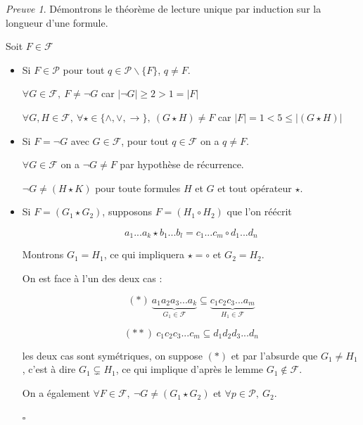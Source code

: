 \documentclass[]{article}
\theoremstyle{remark}
\newtheorem{myproof}{Preuve}
\theoremstyle{definition}
\newcommand{\cqfd}{
	\hfill$\square$
}
\begin{document}
\begin{myproof}
	Démontrons le théorème de lecture unique par induction sur la longueur d'une formule.
	
	Soit $F \in \mathcal{F}$
	
	\begin{itemize}
		\item Si $F \in \mathcal{P}$ pour tout $q \in \mathcal{P} \backslash \{F\}$, $q \neq F$.
		
		$\forall G \in \mathcal{F}, ~ F \neq \neg G$ car $|\neg G| \geqslant 2 > 1 = |F|$
		
		$\forall G, H \in \mathcal{F}, ~ \forall \star \in \{\land, \lor, \longrightarrow\}, ~ (G \star H) \neq F$ car $|F| = 1 < 5 \leqslant |(G \star H)|$
		
		\item Si $F=\neg G$ avec $G \in \mathcal{F}$, pour tout $q \in \mathcal{F}$ on a $q \neq F$.
		
		$\forall G \in \mathcal{F}$ on a $\neg G \neq F$ par hypothèse de récurrence.
		
		$\neg G \neq (H \star K)$ pour toute formules $H$ et $G$ et tout opérateur $\star$.
		
		\item Si $F=(G_1 \star G_2)$, supposons $F=(H_1 \circ H_2)$ que l'on réécrit
		
		$$a_1...a_k \star b_1...b_l = c_1...c_m \circ d_1...d_n$$
		
		Montrons $G_1 = H_1$, ce qui impliquera $\star = \circ$ et $G_2 = H_2$.
		
		On est face à l'un des deux cas :
		
		$$(*) ~ \underbrace{a_1 a_2 a_3 ...a_k}_{G_1 \in \mathcal{F}} \subseteq \underbrace{c_1 c_2 c_3 ...a_m}_{H_1 \in \mathcal{F}}$$
		
		$$(**) ~ c_1 c_2 c_3 ...c_m\subseteq d_1 d_2 d_3 ...d_n$$
		
		les deux cas sont symétriques, on suppose $(*)$ et par l'absurde que $G_1 \neq H_1$, c'est à dire $G_1 \subsetneq H_1$, ce qui implique d'après le lemme $G_1 \notin \mathcal{F}$.
		
		On a également $\forall F \in \mathcal{F}, ~ \neg G \neq (G_1 \star G_2)$ et $\forall p \in \mathcal{P}, ~ G_2$.
		
		\cqfd
	\end{itemize}
\end{myproof}
\end{document}
